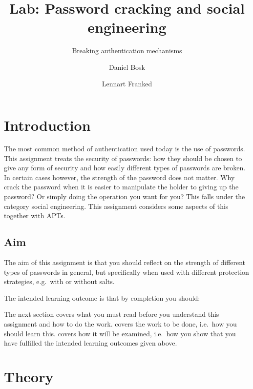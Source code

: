 \title{%
  Lab: Password cracking and social engineering
}
\subtitle{%
  Breaking authentication mechanisms
}
\author{%
  Daniel Bosk \and Lennart Franked
}

\maketitle


\section{Introduction}%
\label{sec:Introduktion}

The most common method of authentication used today is the use of passwords.
This assignment treats the security of passwords: how they should be chosen to 
give any form of security and how easily different types of passwords are 
broken.
In certain cases however, the strength of the password does not matter.
Why crack the password when it is easier to manipulate the holder to giving up 
the password?
Or simply doing the operation you want for you?
This falls under the category social engineering.
This assignment considers some aspects of this together with \acp{APT}.

\subsection{Aim}%
\label{sec:Syfte}

The aim of this assignment is that you should reflect on the strength of 
different types of passwords in general, but specifically when used with 
different protection strategies, e.g.~with or without salts.

The intended learning outcome is that by completion you should:
\begin{itemize}
	
\end{itemize}

The next section covers what you must read before you understand this 
assignment and how to do the work.
 covers the work to be done, i.e.~how you should learn this.
 covers how it will be examined, i.e.~how you show that you have 
fulfilled the intended learning outcomes given above.


\section{Theory}%
\label{sec:theory}

